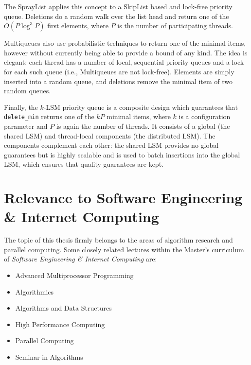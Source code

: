\documentclass[a4paper,11pt]{article}
\begin{document}
The SprayList \cite{alistarhspraylist} applies this concept to a SkipList based
and lock-free priority queue. Deletions do a random walk over the list head
and return one of the $O(P \log^3 P)$ first elements, where $P$ is the number of
participating threads.

Multiqueues \cite{rihani2014multiqueues} also use probabilistic techniques to
return one of the minimal items, however without currently being able to provide
a bound of any kind. The idea is elegant: each thread has a number of local,
sequential priority queues and a lock for each such queue (i.e., Multiqueues are not lock-free).
Elements are simply
inserted into a random queue, and deletions remove the minimal item of two random
queues.

Finally, the $k$-LSM priority queue \cite{wimmer2015lock} is a composite design
which guarantees that \lstinline|delete_min| returns one of the $kP$ minimal
items, where $k$ is a configuration parameter and $P$ is again the number of threads.
It consists of a global (the shared LSM) and thread-local components
(the distributed LSM). The components complement each other: the shared LSM provides
no global guarantees but is highly scalable and is used to batch insertions into
the global LSM, which ensures that quality guarantees are kept.

\section{Relevance to Software Engineering \& Internet Computing}

The topic of this thesis firmly belongs to the areas of algorithm research
and parallel computing. Some closely related lectures within the Master's
curriculum of \emph{Software Engineering \& Internet Computing} are:

\begin{itemize}
    \item Advanced Multiprocessor Programming
    \item Algorithmics
    \item Algorithms and Data Structures
    \item High Performance Computing
    \item Parallel Computing
    \item Seminar in Algorithms
\end{itemize}

\printbibliography
\end{document}
